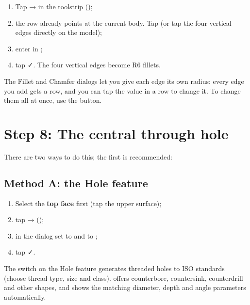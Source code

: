 \begin{enumerate}
  \item Tap  →  in the toolstrip ();
  \item the  row already points at the current body. Tap  (or tap the four vertical edges
        directly on the model);
  \item enter  in ;
  \item tap ✓. The four vertical edges become R6 fillets.
\end{enumerate}

\begin{tip}
The Fillet and Chamfer dialogs let you give each edge its own radius: every edge you add gets a row, and you
can tap the value in a row to change it. To change them all at once, use the  button.
\end{tip}

\section{Step 8: The central through hole}

There are two ways to do this; the first is recommended:

\subsection{Method A: the Hole feature}

\begin{enumerate}
  \item Select the \textbf{top face} first (tap the upper surface);
  \item tap  →  ();
  \item in the dialog set  to  and  to ;
  \item tap ✓.
\end{enumerate}

\begin{tip}
The  switch on the Hole feature generates threaded holes to ISO standards (choose thread type,
size and class).  offers counterbore, countersink, counterdrill and other shapes, and shows the
matching diameter, depth and angle parameters automatically.
\end{tip}

